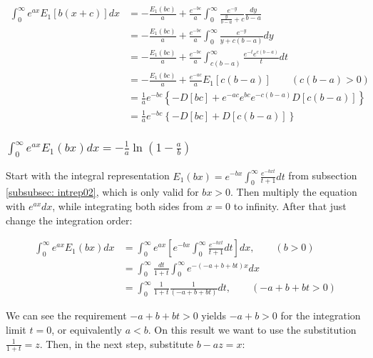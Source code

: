 \documentclass[bibliography=totocnumbered]{scrartcl}
\newcommand{\assume}[1][\text{MISSING PARAMETER}]{,\qquad\left(#1\right)}
\begin{document}
	\begin{align}
		\int_{0}^{\infty}e^{ax}E_1\left[b\left(x+c\right)\right]dx&=-\frac{E_1\left(bc\right)}{a}+\frac{e^{-bc}}{a}\int_{0}^{\infty}\frac{e^{-y}}{\frac{y}{b-a}+c}\frac{dy}{b-a}\\
		&=-\frac{E_1\left(bc\right)}{a}+\frac{e^{-bc}}{a}\int_{0}^{\infty}\frac{e^{-y}}{y+c\left(b-a\right)}dy\\
		&=-\frac{E_1\left(bc\right)}{a}+\frac{e^{-bc}}{a}\int_{c\left(b-a\right)}^{\infty}\frac{e^{-t}e^{c\left(b-a\right)}}{t}dt\\	&=-\frac{E_1\left(bc\right)}{a}+\frac{e^{-ac}}{a}E_1\left[c\left(b-a\right)\right]\qquad\left(c\left(b-a\right)>0\right)\label{eq: int01Condition}\\
		&=\frac{1}{a}e^{-bc}\left\{-D\left[bc\right]+e^{-ac}e^{bc}e^{-c\left(b-a\right)}D\left[c\left(b-a\right)\right]\right\}\\
		&=\frac{1}{a}e^{-bc}\left\{-D\left[bc\right]+D\left[c\left(b-a\right)\right]\right\}\label{eq: generalIntegralOfE2}
	\end{align}
	
	\subsubsection[A integral of E1, involving the exponential function]{$\int_{0}^{\infty}e^{ax}E_1\left(bx\right)dx=-\frac{1}{a}\ln\left(1-\frac{a}{b}\right)$}
	\label{subsubsec: generalIntegralOfE3}
	
	Start with the integral representation $E_1\left(bx\right)=e^{-bx}\int_{0}^{\infty}\frac{e^{-bxt}}{t+1}dt$ from subsection \ref{subsubsec: intrep02}, which is only valid for $bx>0$. Then multiply the equation with $e^{ax}dx$, while integrating both sides from $x=0$ to infinity. After that just change the integration order:
	
	\begin{align}
		\int_{0}^{\infty}e^{ax}E_1\left(bx\right)dx&=\int_{0}^{\infty}e^{ax}\left[e^{-bx}\int_{0}^{\infty}\frac{e^{-bxt}}{t+1}dt\right]dx\assume[b>0]\\
		&=\int_{0}^{\infty}\frac{dt}{1+t}\int_{0}^{\infty}e^{-\left(-a+b+bt\right)x}dx\\
		&=\int_{0}^{\infty}\frac{1}{1+t}\frac{1}{\left(-a+b+bt\right)}dt\assume[-a+b+bt>0]
	\end{align}
	
	We can see the requirement $-a+b+bt>0$ yields $-a+b>0$ for the integration limit $t=0$, or equivalently $a<b$. On this result we want to use the substitution $\frac{1}{1+t}=z$. Then, in the next step, substitute $b-az=x$:
	
\end{document}
